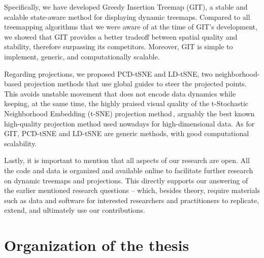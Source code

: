 Specifically, we have developed Greedy Insertion Treemap (GIT), a stable and scalable state-aware method for displaying dynamic treemaps. Compared to all treemapping algorithms that we were aware of at the time of GIT's development, we showed that GIT provides a better tradeoff between spatial quality and stability, therefore surpassing its competitors. Moreover, GIT is simple to implement, generic, and computationally scalable.

Regarding projections, we proposed PCD-tSNE and LD-tSNE, two neighborhood-based projection methods that use global guides to steer the projected points. This avoids unstable movement that does not encode data dynamics while keeping, at the same time, the highly praised visual quality of the t-Stochastic Neighborhood Embedding (t-SNE) projection method\,\cite{xxx}, arguably the best known high-quality projection method used nowadays for high-dimensional data. As for GIT, PCD-tSNE and LD-tSNE are generic methods, with good computational scalability.

\bigbreak

Lastly, it is important to mention that all aspects of our research are open. All the code and data is organized and available online to facilitate further research on dynamic treemaps and projections. This directly supports our answering of the earlier mentioned research questions -- which, besides theory, require materials such as data and software for interested researchers and practitioners to replicate, extend, and ultimately use our contributions.

\section{Organization of the thesis}






